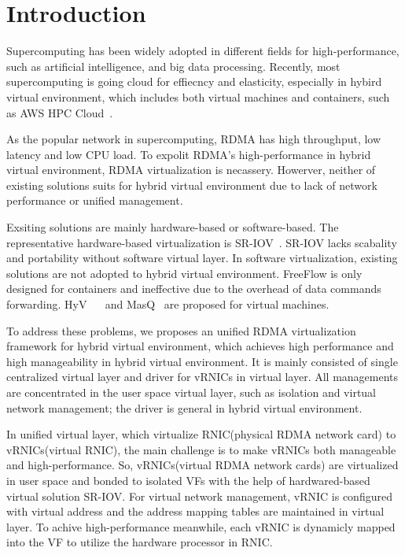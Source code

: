 \section{Introduction}
 Supercomputing has been widely adopted in different fields for high-performance, such as artificial intelligence, and big data processing. Recently, most supercomputing is going cloud for effiecncy and elasticity, especially in hybird virtual environment, which includes both virtual machines and containers, such as AWS HPC Cloud~\cite{aws-hpc}. 

As the popular network in supercomputing, RDMA has high throughput, low latency and low CPU load. To expolit RDMA's high-performance in hybrid virtual environment, RDMA virtualization is necassery. Howerver, neither of existing solutions suits for hybrid virtual environment due to lack of network performance or unified management.

Exsiting solutions are mainly hardware-based or software-based. The representative hardware-based virtualization is SR-IOV~\cite{sr-iov}. SR-IOV lacks scabality and portability without software virtual layer. In software virtualization, existing solutions are not adopted to hybrid virtual environment. FreeFlow is only designed for containers and ineffective due to the overhead of data commands forwarding.  HyV~\cite{pfefferle2015hybrid} ~\cite{pfefferle2014vverbs} and MasQ~\cite{he2020masq} are proposed for virtual machines.

To address these problems, we proposes an unified RDMA virtualization framework for hybrid virtual environment, which achieves high performance and high manageability in hybrid virtual environment. It is mainly consisted of single centralized virtual layer and driver for vRNICs in virtual layer. All managements are concentrated in the user space virtual layer, such as isolation and virtual network management; the driver is general in hybrid virtual environment. 

In unified virtual layer, which virtualize RNIC(physical RDMA network card) to vRNICs(virtual RNIC), the main challenge is to make vRNICs both manageable and high-performance. So, vRNICs(virtual RDMA network cards) are virtualized in user space and bonded to isolated VFs with the help of hardwared-based virtual solution SR-IOV. For virtual network management, vRNIC is configured with virtual address and the address mapping tables are maintained in virtual layer. To achive high-performance meanwhile, each vRNIC is dynamicly mapped into the VF to utilize the hardware processor in RNIC.

